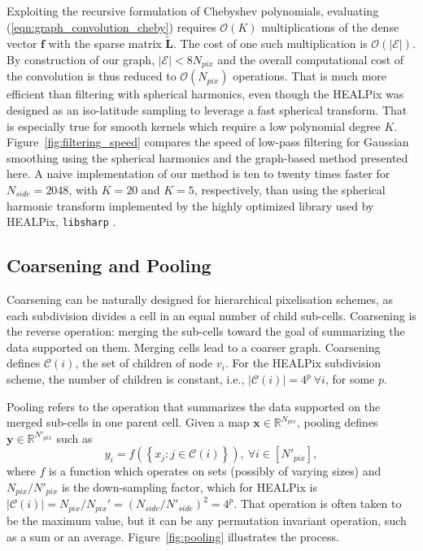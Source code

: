 \documentclass[final,twocolumn,3p,times,authoryear]{elsarticle}
\newcommand{\figref}[1]{Figure~\ref{fig:#1}}
\newcommand{\eqnref}[1]{(\ref{eqn:#1})}
\renewcommand{\b}[1]{{\bm{#1}}}   %
\newcommand{\1}{\b{1}}              %
\newcommand{\0}{\b{0}}              %
\newcommand{\E}{\mathcal{E}}
\newcommand{\C}{\mathcal{C}}
\renewcommand{\L}{\b{L}}
\newcommand{\tL}{\tilde{\L}}
\newcommand{\x}{\b{x}}
\newcommand{\y}{\b{y}}
\newcommand{\f}{\b{f}}
\newcommand{\R}{\mathbb{R}}
\newcommand{\bO}{\mathcal{O}}
\newcommand{\pkg}[1]{\texttt{#1}}
\begin{document}
Exploiting the recursive formulation of Chebyshev polynomials, evaluating \eqnref{graph_convolution_cheby} requires $\bO(K)$ multiplications of the dense vector $\f$ with the sparse matrix $\tL$.
The cost of one such multiplication is $\bO(|\E|)$. By construction of our graph, $|\E| < 8 N_{pix}$ and the overall computational cost of the convolution is thus reduced to $\bO(N_{pix})$ operations.
That is much more efficient than filtering with spherical harmonics, even though the HEALPix was designed as an iso-latitude sampling to leverage a fast spherical transform.
That is especially true for smooth kernels which require a low polynomial degree $K$.
\figref{filtering_speed} compares the speed of low-pass filtering for Gaussian smoothing using the spherical harmonics and the graph-based method presented here.
A naive implementation of our method is ten to twenty times faster for $N_{side} = 2048$, with $K=20$ and $K=5$, respectively, than using the spherical harmonic transform implemented by the highly optimized library used by HEALPix, \pkg{libsharp} \citep{reinecke2013libsharp}.

\subsection{Coarsening and Pooling}

Coarsening can be naturally designed for hierarchical pixelisation schemes, as each subdivision divides a cell in an equal number of child sub-cells.
Coarsening is the reverse operation: merging the sub-cells toward the goal of summarizing the data supported on them.
Merging cells lead to a coarser graph.
Coarsening defines $\C(i)$, the set of children of node $v_i$.
For the HEALPix subdivision scheme, the number of children is constant, i.e., $| \C(i) | = 4^p \ \forall i$, for some $p$.

Pooling refers to the operation that summarizes the data supported on the merged sub-cells in one parent cell.
Given a map $\x \in \R^{N_{pix}}$, pooling defines $\y \in \R^{N'_{pix}}$ such as
\begin{equation} \label{eqn:pooling}
	y_i = f \left( \left\{ x_j : j \in \C(i) \right\} \right), \ \forall i \in [N'_{pix}],
\end{equation}
where $f$ is a function which operates on sets (possibly of varying sizes) and $N_{pix} / {N'_{pix}}$ is the down-sampling factor, which for HEALPix is $| \C(i) | = N_{pix} / {N_{pix}}' = (N_{side} / N'_{side})^2 = 4^p$.
That operation is often taken to be the maximum value, but it can be any permutation invariant operation, such as a sum or an average.
\figref{pooling} illustrates the process.
\end{document}
